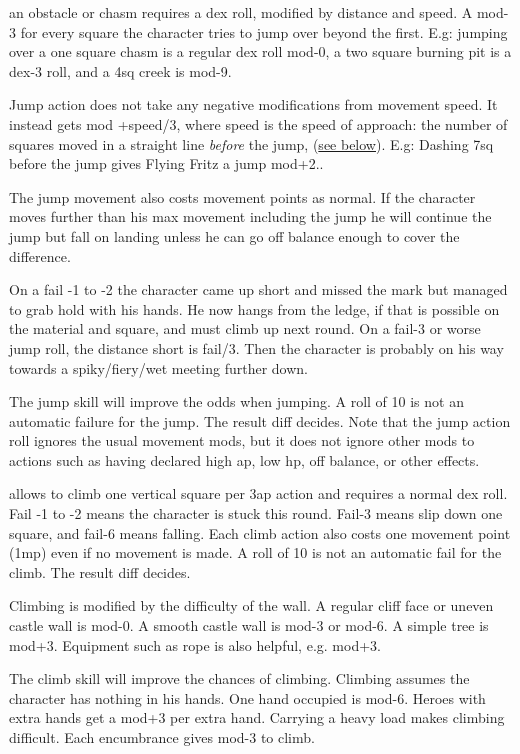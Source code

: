  an obstacle or chasm requires a dex roll, modified by distance and speed. A mod-3 for every square the character tries to jump over beyond the first. E.g: jumping over a one square chasm is a regular dex roll mod-0, a two square burning pit is a dex-3 roll, and a 4sq creek is mod-9.

Jump action does not take any negative modifications from movement speed. It instead gets mod +speed/3, where speed is the speed of approach: the number of squares moved in a straight line \emph{before} the jump, (\hyperref[approach]{see below}).
E.g: Dashing 7sq before the jump gives Flying Fritz a jump mod+2..

The jump movement also costs movement points as normal. If the character moves further than his max movement including the jump he will continue the jump but fall on landing unless he can go off balance enough to cover the difference.

On a fail -1 to -2 the character came up short and missed the mark but managed to grab hold with his hands. He now hangs from the ledge, if that is possible on the material and square, and must climb up next round. On a fail-3 or worse jump roll, the distance short is fail/3. Then the character is probably on his way towards a spiky/fiery/wet meeting further down.

The jump skill will improve the odds when jumping. A roll of 10 is not an automatic failure for the jump. The result diff decides. Note that the jump action roll ignores the usual movement mods, but it does not ignore other mods to actions such as having declared high ap, low hp, off balance, or other effects.


 allows to climb one vertical square per 3ap action and requires a normal dex roll. Fail -1 to -2 means the character is stuck this round. Fail-3 means slip down one square, and fail-6 means falling. Each climb action also costs one movement point (1mp) even if no movement is made. A roll of 10 is not an automatic fail for the climb. The result diff decides.

Climbing is modified by the difficulty of the wall. A regular cliff face or uneven castle wall is mod-0. A smooth castle wall is mod-3 or mod-6. A simple tree is mod+3. Equipment such as rope is also helpful, e.g. mod+3.

The climb skill will improve the chances of climbing. Climbing assumes the character has nothing in his hands. One hand occupied is mod-6. Heroes with extra hands get a mod+3 per extra hand. Carrying a heavy load makes climbing difficult. Each encumbrance gives mod-3 to climb.


